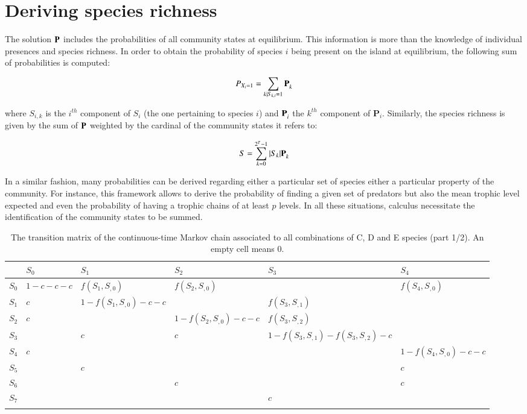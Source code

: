 \section{Deriving species richness}\label{deriving-species-richness}

The solution \(\mathbf{P}^{\*}\) includes the probabilities of all
community states at equilibrium. This information is more than
the knowledge of individual presences and species richness.
In order to obtain the probability of species $i$ being present on the island
at equilibrium, the following sum of probabilities is computed:

\begin{equation}
P_{X_i=1} = \sum_{k \mid S_{k,i}=1} \mathbf{P}_{k}^{\*}
\end{equation}

where \(S_{i,k}\) is the \(i^{th}\) component of \(S_i\) (the one
pertaining to species \(i\)) and \(\mathbf{P}_{i}^{\*}\) the \(k^{th}\)
component of \(\mathbf{P}_{i}\). Similarly, the species richness is
given by the sum of \(\mathbf{P}^{\*}\) weighted by the cardinal of the
community states it refers to:

\begin{equation}
S= \sum_{k=0}^{2^T-1} |S_k|\mathbf{P}_{k}^{\*}
\end{equation}

In a similar fashion, many probabilities can be derived regarding either
a particular set of species either a particular property of the
community. For instance, this framework allows to derive the probability
of finding a given set of predators but also the mean trophic level
expected and even the probability of having a trophic chains of at least
\(p\) levels. In all these situations, calculus necessitate the
identification of the community states to be summed.


\newpage

\begin{landscape}

  \begin{longtable}[]{@{}llllll@{}}
  \caption[Transition matrix of the continuous-time Markov chain (part 1/2)]{The transition matrix of the continuous-time Markov chain
  associated to all combinations of C, D and E species (part 1/2). An empty cell means 0.}\tabularnewline
  \toprule
  & \(S_{0}\) & \(S_{1}\) & \(S_{2}\) & \(S_{3}\) &
  \(S_{4}\)\tabularnewline
  \midrule
  \endhead
  \(S_{0}\) & \(1-c-c-c\) & \(f(S_{1},S_{,0})\) & \(f(S_{2},S_{,0})\) & &
  \(f(S_{4},S_{,0})\)\tabularnewline
  \(S_{1}\) & \(c\) & \(1-f(S_{1},S_{,0})-c-c\) & & \(f(S_{3},S_{,1})\)
  &\tabularnewline
  \(S_{2}\) & \(c\) & & \(1-f(S_{2},S_{,0})-c-c\) & \(f(S_{3},S_{,2})\)
  &\tabularnewline
  \(S_{3}\) & & \(c\) & \(c\) & \(1-f(S_{3},S_{,1})-f(S_{3},S_{,2})-c\)
  &\tabularnewline
  \(S_{4}\) & \(c\) & & & & \(1-f(S_{4},S_{,0})-c-c\)\tabularnewline
  \(S_{5}\) & & \(c\) & & & \(c\)\tabularnewline
  \(S_{6}\) & & & \(c\) & & \(c\)\tabularnewline
  \(S_{7}\) & & & & \(c\) &\tabularnewline
  \bottomrule
  \label{tabAnnIII_3}
  \end{longtable}


\end{landscape}



